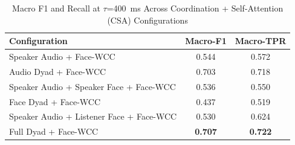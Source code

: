 \begin{table}[h]
\caption{Macro F1 and Recall at $\tau$=400~ms Across Coordination + Self-Attention (CSA) Configurations}
\label{tab:macro_csa}
\small
\renewcommand{\arraystretch}{1.20}
\begin{tabular}{>{\raggedright\arraybackslash}p{4cm}cc}
\toprule
Configuration & Macro-F1 & Macro-TPR \\
\midrule
Speaker Audio + Face-WCC & 0.544 & 0.572 \\
Audio Dyad + Face-WCC & 0.703 & 0.718 \\
Speaker Audio + Speaker Face + Face-WCC & 0.536 & 0.550 \\
Face Dyad + Face-WCC & 0.437 & 0.519 \\
Speaker Audio + Listener Face + Face-WCC & 0.530 & 0.624 \\
Full Dyad + Face-WCC & \textbf{0.707} & \textbf{0.722} \\
\bottomrule
\end{tabular}
\end{table}
